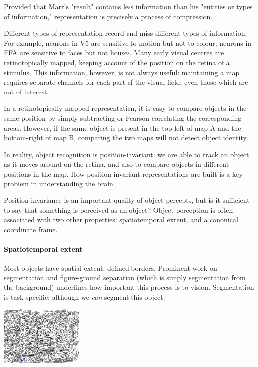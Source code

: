 Provided that Marr's "result" contains less information than his "entities or types of information," representation is precisely a process of compression.

Different types of representation record and miss different types of information. For example, neurons in V5 are sensitive to motion but not to colour; neurons in FFA are sensitive to faces but not houses. Many early visual centres are retinotopically mapped, keeping account of the position on the retina of a stimulus. This information, however, is not always useful: maintaining a map requires separate channels for each part of the visual field, even those which are not of interest.

In a retinotopically-mapped representation, it is easy to compare objects in the same position by simply subtracting or Pearson-correlating the corresponding areas. However, if the same object is present in the top-left of map A and the bottom-right of map B, comparing the two maps will not detect object identity.

In reality, object recognition is position-invariant: we are able to track an object as it moves around on the retina, and also to compare objects in different positions in the map. How position-invariant representations are built is a key problem in understanding the brain\cite{stringer2000position}.

Position-invariance is an important quality of object percepts, but is it sufficient to say that something is perceived as an object? Object perception is often associated with two other properties: spatiotemporal extent, and a canonical coordinate frame.

\paragraph{Spatiotemporal extent}
Most objects have spatial extent: defined borders. Prominent work on segmentation\cite{kiper1996cortical,grossberg1987role,atkinson1992visual,riseman1977computational,li1999visual} and figure-ground separation\cite{kelly2000neural,grossberg1993figure,grossberg19943} (which is simply segmentation from the background) underlines how important this process is to vision. Segmentation is task-specific: although we \textit{can} segment this object:
\begin{center}
\includegraphics[width=0.3\textwidth]{img/maze.png}
\end{center}

